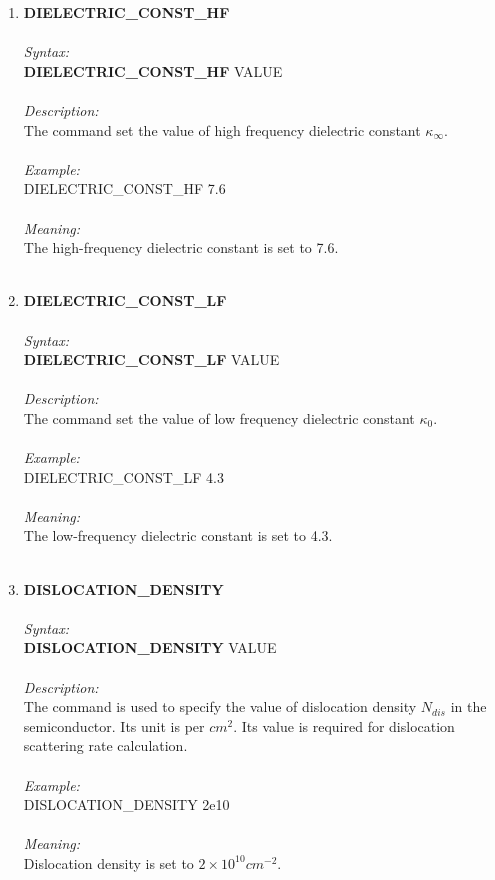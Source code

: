 \documentclass[12pt]{article}
\begin{document}
\begin{enumerate}
    \item \textbf{DIELECTRIC\_CONST\_HF} \\ \\
    \textit{Syntax:} \\
    \textbf{DIELECTRIC\_CONST\_HF} VALUE \\ \\
    \textit{Description:} \\
    The command set the value of high frequency dielectric constant $\kappa_\infty$. \\ \\
    \textit{Example:} \\
    DIELECTRIC\_CONST\_HF 7.6 \\ \\
    \textit{Meaning:} \\    
    The high-frequency dielectric constant is set to 7.6. \\ \\

    \item \textbf{DIELECTRIC\_CONST\_LF} \\ \\
    \textit{Syntax:} \\
    \textbf{DIELECTRIC\_CONST\_LF} VALUE \\ \\
    \textit{Description:} \\
    The command set the value of low frequency dielectric constant $\kappa_0$. \\ \\
    \textit{Example:} \\
    DIELECTRIC\_CONST\_LF 4.3 \\ \\
    \textit{Meaning:} \\    
    The low-frequency dielectric constant is set to 4.3.\\ \\

    \item \textbf{DISLOCATION\_DENSITY} \\ \\
    \textit{Syntax:} \\
    \textbf{DISLOCATION\_DENSITY} VALUE \\ \\
    \textit{Description:} \\
    The command is used to specify the value of dislocation density $N_{dis}$ in the semiconductor. Its unit is per $cm^2$. Its value is required for dislocation scattering rate calculation.\\ \\
    \textit{Example:} \\
    DISLOCATION\_DENSITY 2e10 \\ \\ 
    \textit{Meaning:} \\    
    Dislocation density is set to $2 \times 10^{10} cm^{-2}$. \\ \\


\end{enumerate}
\end{document}

